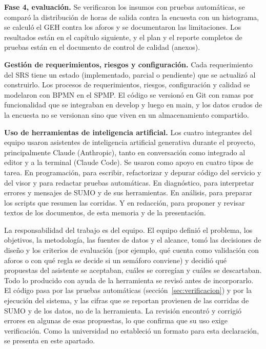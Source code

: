 \textbf{Fase 4, evaluación.} Se verificaron los insumos con pruebas automáticas, se comparó la distribución de horas de salida contra la encuesta con un histograma, se calculó el GEH contra los aforos y se documentaron las limitaciones. Los resultados están en el capítulo siguiente, y el plan y el reporte completos de pruebas están en el documento de control de calidad (anexos).

\textbf{Gestión de requerimientos, riesgos y configuración.} Cada requerimiento del SRS tiene un estado (implementado, parcial o pendiente) que se actualizó al construirlo. Los procesos de requerimientos, riesgos, configuración y calidad se modelaron con BPMN en el SPMP. El código se versionó en Git con ramas por funcionalidad que se integraban en develop y luego en main, y los datos crudos de la encuesta no se versionan sino que viven en un almacenamiento compartido.

\textbf{Uso de herramientas de inteligencia artificial.} Los cuatro integrantes del equipo usaron asistentes de inteligencia artificial generativa durante el proyecto, principalmente Claude (Anthropic), tanto en conversación como integrado al editor y a la terminal (Claude Code). Se usaron como apoyo en cuatro tipos de tarea. En programación, para escribir, refactorizar y depurar código del servicio y del visor y para redactar pruebas automáticas. En diagnóstico, para interpretar errores y mensajes de SUMO y de sus herramientas. En análisis, para preparar los scripts que resumen las corridas. Y en redacción, para proponer y revisar textos de los documentos, de esta memoria y de la presentación.

La responsabilidad del trabajo es del equipo. El equipo definió el problema, los objetivos, la metodología, las fuentes de datos y el alcance, tomó las decisiones de diseño y los criterios de evaluación (por ejemplo, qué cuenta como validación con aforos o con qué regla se decide si un semáforo conviene) y decidió qué propuestas del asistente se aceptaban, cuáles se corregían y cuáles se descartaban. Todo lo producido con ayuda de la herramienta se revisó antes de incorporarlo. El código pasa por las pruebas automáticas (sección~\ref{sec:verificacion}) y por la ejecución del sistema, y las cifras que se reportan provienen de las corridas de SUMO y de los datos, no de la herramienta. La revisión encontró y corrigió errores en algunas de esas propuestas, lo que confirma que su uso exige verificación. Como la universidad no estableció un formato para esta declaración, se presenta en este apartado.

